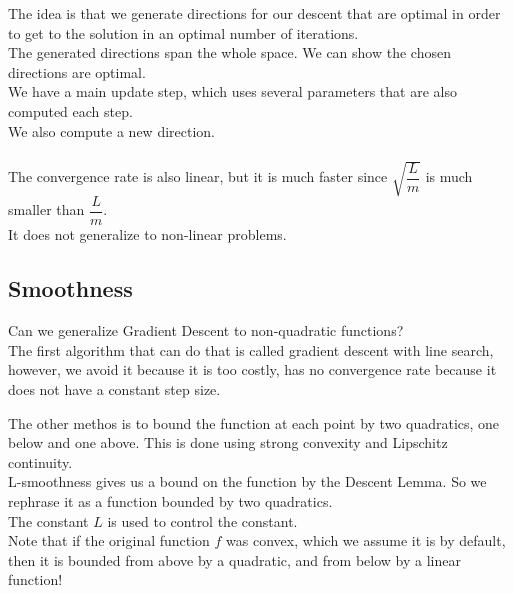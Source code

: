 \documentclass[12pt]{article}
\begin{document}
The idea is that we generate directions for our
descent that are optimal in order to get to the solution
in an optimal number of iterations. \\

The generated directions span the whole space.
We can show the chosen directions are optimal. \\

We have a main update step, which uses several
parameters that are also computed each step. \\
We also compute a new direction. \\

 \\

The convergence rate is also linear, but it is much faster
since $\sqrt{\dfrac{L}{m}}$ is much smaller 
than $\dfrac{L}{m}$. \\

It does not generalize to non-linear problems. \\

\newpage

\subsection*{Smoothness}

Can we generalize Gradient Descent to non-quadratic
functions? \\

The first algorithm that can do that is called
gradient descent with line search,
however, we avoid it because it is too
costly, has no convergence rate because it
does not have a constant step size. \

The other methos is to 
bound the function at each point
by two quadratics, one below and one above.
This is done using strong convexity
and Lipschitz continuity. \\

L-smoothness gives us a bound on the function
by the Descent Lemma. 
So we rephrase it as a function
bounded by two quadratics. \\

The constant $L$ is used to control the
constant. \\

Note that if the original function $f$ was
convex, which we assume it is by default,
then it is bounded from above by a quadratic,
and from below by a linear function! \\
\end{document}

